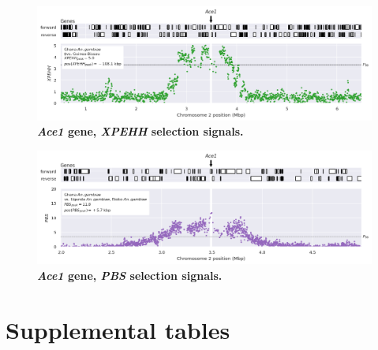 \documentclass[a4paper,11pt,abstracton,hidelinks]{scrartcl}
\begin{document}
\begin{figure}[t!]
	\begin{center}
		\includegraphics*[width=1\linewidth,center]{artwork/locus_ace1_xpehh_pdist.png}
	\end{center}
	\caption[\textit{Ace1} gene, \textit{XPEHH} selection signals]{
	\textbf{\textit{Ace1} gene, \textit{XPEHH} selection signals.}
	} 
	\label{fig:locus_ace1_xpehh}
\end{figure}


\clearpage


\begin{figure}[t!]
	\begin{center}
		\includegraphics*[width=1\linewidth,center]{artwork/locus_ace1_pbs_pdist.png}
	\end{center}
	\caption[\textit{Ace1} gene, \textit{PBS} selection signals]{
	\textbf{\textit{Ace1} gene, \textit{PBS} selection signals.}
	} 
	\label{fig:locus_ace1_pbs}
\end{figure}


\clearpage

\section{Supplemental tables}
\end{document}
